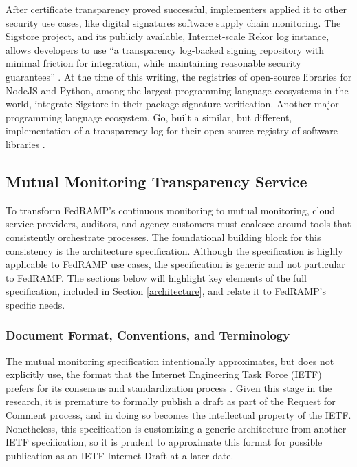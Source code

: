 \documentclass{jdf}
\begin{document}
After certificate transparency proved successful, implementers applied it to other security use cases, like digital signatures software supply chain monitoring. The \href{https://sigstore.dev}{Sigstore} project, and its publicly available, Internet-scale \href{https://rekor.sigstore.dev/}{Rekor log instance}, allows developers to use ``a transparency log-backed signing repository with minimal friction for integration, while maintaining reasonable security guarantees'' \cite[p.~2365]{newman22}. At the time of this writing, the registries of open-source libraries for NodeJS and Python, among the largest programming language ecosystems in the world, integrate Sigstore in their package signature verification. Another major programming language ecosystem, Go, built a similar, but different, implementation of a transparency log for their open-source registry of software libraries \cite{hockman19}.

\subsection{Mutual Monitoring Transparency Service}

To transform FedRAMP's continuous monitoring to mutual monitoring, cloud service providers, auditors, and agency customers must coalesce around tools that consistently orchestrate processes. The foundational building block for this consistency is the architecture specification. Although the specification is highly applicable to FedRAMP use cases, the specification is generic and not particular to FedRAMP. The sections below will highlight key elements of the full specification, included in Section \ref{architecture}, and relate it to FedRAMP's specific needs.

\subsubsection{Document Format, Conventions, and Terminology}

The mutual monitoring specification intentionally approximates, but does not explicitly use, the format that the Internet Engineering Task Force (IETF) prefers for its consensus and standardization process \citeyear{ietf_authors_format}. Given this stage in the research, it is premature to formally publish a draft as part of the Request for Comment process, and in doing so becomes the intellectual property of the IETF. Nonetheless, this specification is customizing a generic architecture from another IETF specification, so it is prudent to approximate this format for possible publication as an IETF Internet Draft at a later date. 
\end{document}
